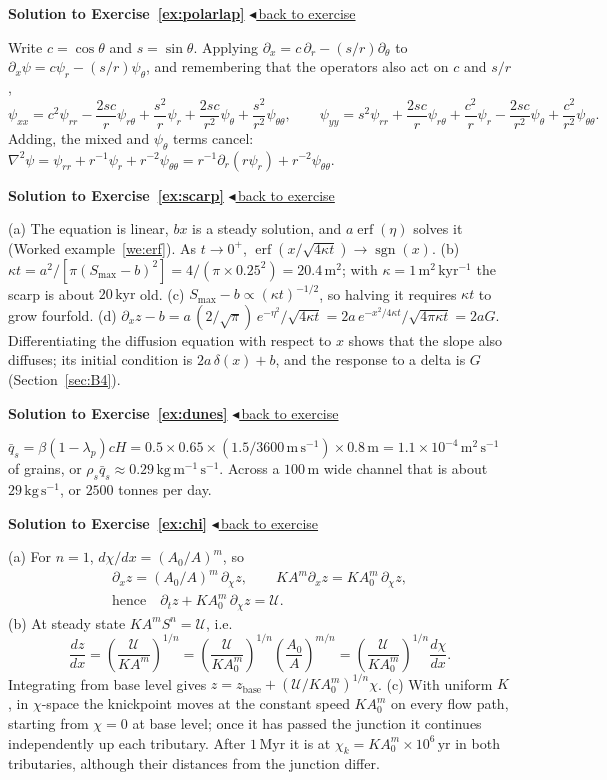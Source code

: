 \documentclass[11pt,letterpaper]{article}
\numberwithin{equation}{section}
\newcommand{\od}[2]{\frac{d #1}{d #2}}
\newcommand{\units}[1]{\,\mathrm{#1}}
\DeclareMathOperator{\erf}{erf}
\DeclareMathOperator{\sgn}{sgn}
\newenvironment{solution}[1]{%
  \par\addvspace{1.0ex}\noindent\phantomsection\label{sol:#1}%
  {\color{exorange!85!black}\bfseries Solution to Exercise~\ref{ex:#1}}%
  \hfill\hyperref[ex:#1]{\small$\blacktriangleleft$\,back to exercise}\par\nopagebreak\smallskip}%
  {\par\smallskip\noindent{\color{exorange!40}\rule{\linewidth}{0.4pt}}\par}
\newcommand{\Up}{\mathcal{U}}
\begin{document}
\begin{solution}{polarlap}
Write $c=\cos\theta$ and $s=\sin\theta$. Applying $\partial_x=c\,\partial_r-(s/r)\partial_\theta$ to $\partial_x\psi=c\psi_r-(s/r)\psi_\theta$, and remembering that the
operators also act on $c$ and $s/r$,
\[
\psi_{xx}=c^2\psi_{rr}-\frac{2sc}{r}\psi_{r\theta}+\frac{s^2}{r}\psi_r+\frac{2sc}{r^2}\psi_\theta+\frac{s^2}{r^2}\psi_{\theta\theta},\qquad
\psi_{yy}=s^2\psi_{rr}+\frac{2sc}{r}\psi_{r\theta}+\frac{c^2}{r}\psi_r-\frac{2sc}{r^2}\psi_\theta+\frac{c^2}{r^2}\psi_{\theta\theta}.
\]
Adding, the mixed and $\psi_\theta$ terms cancel: $\nabla^2\psi=\psi_{rr}+r^{-1}\psi_r+r^{-2}\psi_{\theta\theta}=r^{-1}\partial_r(r\psi_r)+r^{-2}\psi_{\theta\theta}$.
\end{solution}

\begin{solution}{scarp}
(a) The equation is linear, $bx$ is a steady solution, and $a\erf(\eta)$ solves it (Worked example~\ref{we:erf}). As $t\to0^+$,
$\erf(x/\sqrt{4\kappa t})\to\sgn(x)$.
(b) $\kappa t=a^2/[\pi(S_{\max}-b)^2]=4/(\pi\times0.25^2)=20.4\units{m^2}$; with $\kappa=1\units{m^2\,kyr^{-1}}$ the scarp is about $20\units{kyr}$ old.
(c) $S_{\max}-b\propto(\kappa t)^{-1/2}$, so halving it requires $\kappa t$ to grow fourfold.
(d) $\partial_xz-b=a\,(2/\sqrt\pi)\,e^{-\eta^2}/\sqrt{4\kappa t}=2a\,e^{-x^2/4\kappa t}/\sqrt{4\pi\kappa t}=2aG$. Differentiating the diffusion equation with respect
to $x$ shows that the slope also diffuses; its initial condition is $2a\,\delta(x)+b$, and the response to a delta is $G$ (Section~\ref{sec:B4}).
\end{solution}

\begin{solution}{dunes}
$\bar q_s=\beta(1-\lambda_p)cH=0.5\times0.65\times(1.5/3600\units{m\,s^{-1}})\times0.8\units{m}=1.1\times10^{-4}\units{m^2\,s^{-1}}$ of grains, or
$\rho_s\bar q_s\approx0.29\units{kg\,m^{-1}\,s^{-1}}$. Across a $100\units{m}$ wide channel that is about $29\units{kg\,s^{-1}}$, or $2500$ tonnes per day.
\end{solution}

\begin{solution}{chi}
(a) For $n=1$, $d\chi/dx=(A_0/A)^m$, so
\begin{gather*}
\partial_xz=(A_0/A)^m\,\partial_\chi z,\qquad KA^m\partial_xz=KA_0^m\,\partial_\chi z,\\
\text{hence}\quad \partial_tz+KA_0^m\,\partial_\chi z=\Up .
\end{gather*}
(b) At steady state $KA^mS^n=\Up$, i.e.
\[
\od{z}{x}=\left(\frac{\Up}{KA^m}\right)^{1/n}=\left(\frac{\Up}{KA_0^m}\right)^{1/n}\left(\frac{A_0}{A}\right)^{m/n}=\left(\frac{\Up}{KA_0^m}\right)^{1/n}\od{\chi}{x}.
\]
Integrating from base level gives $z=z_{\mathrm{base}}+(\Up/KA_0^m)^{1/n}\chi$.
(c) With uniform $K$, in $\chi$-space the knickpoint moves at the constant speed $KA_0^m$ on every flow path, starting from $\chi=0$
at base level; once it has passed the junction it continues independently up each tributary. After $1\units{Myr}$ it is at
$\chi_k=KA_0^m\times10^6\units{yr}$ in both tributaries, although their distances from the junction differ.
\end{solution}
\end{document}
